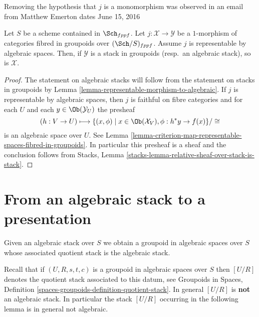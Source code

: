 \begin{lemma}
\label{lemma-open-fibred-category-is-algebraic}
\begin{reference}
Removing the hypothesis that $j$ is a monomorphism was observed
in an email from Matthew Emerton dates June 15, 2016
\end{reference}
Let $S$ be a scheme contained in $\Sch_{fppf}$.
Let $j : \mathcal X \to \mathcal Y$ be a $1$-morphism of
categories fibred in groupoids over $(\Sch/S)_{fppf}$.
Assume $j$ is representable by algebraic spaces.
Then, if $\mathcal{Y}$ is a stack in groupoids
(resp.\ an algebraic stack), so is $\mathcal{X}$.
\end{lemma}

\begin{proof}
The statement on algebraic stacks will follow from the statement on
stacks in groupoids by Lemma \ref{lemma-representable-morphism-to-algebraic}.
If $j$ is representable by algebraic spaces, then $j$ is
faithful on fibre categories and for each $U$ and each
$y \in \Ob(\mathcal{Y}_U)$ the presheaf
$$
(h : V \to U)
\longmapsto
\{(x, \phi) \mid x \in \Ob(\mathcal{X}_V), \phi : h^*y \to f(x)\}/\cong
$$
is an algebraic space over $U$. See
Lemma \ref{lemma-criterion-map-representable-spaces-fibred-in-groupoids}.
In particular this presheaf is a sheaf and the conclusion follows
from Stacks, Lemma \ref{stacks-lemma-relative-sheaf-over-stack-is-stack}.
\end{proof}



\section{From an algebraic stack to a presentation}
\label{section-stack-to-presentation}

\noindent
Given an algebraic stack over $S$ we obtain a groupoid in algebraic spaces
over $S$ whose associated quotient stack is the algebraic stack.

\medskip\noindent
Recall that if $(U, R, s, t, c)$ is a groupoid in algebraic spaces over $S$
then $[U/R]$ denotes the quotient stack associated to this datum, see
Groupoids in Spaces,
Definition \ref{spaces-groupoids-definition-quotient-stack}.
In general $[U/R]$ is {\bf not} an algebraic stack. In particular the
stack $[U/R]$ occurring in the following lemma is in general not
algebraic.

